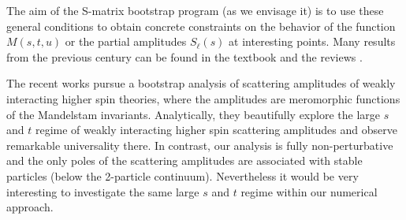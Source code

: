 \documentclass[12pt]{article}
\newcommand{\<}{{\langle}}
\renewcommand{\>}{{\rangle}}
\begin{document}
The aim of the S-matrix bootstrap program (as we envisage it) is to use these general conditions to obtain concrete constraints on the behavior of the function $M(s,t,u)$ or the partial amplitudes $S_\ell(s)$ at interesting points. Many results from the previous century can be found in the textbook \cite{martinbook} and the reviews \cite{tourdefrance,Martin:944356}.

The recent works \cite{Caron-Huot:2016icg,Sever:2017ylk}  pursue a bootstrap analysis of scattering amplitudes of weakly interacting higher spin theories, where the amplitudes are meromorphic functions of the Mandelstam invariants. Analytically, they beautifully explore the large $s$ and $t$ regime of weakly interacting higher spin scattering amplitudes and observe remarkable universality there. In contrast, our analysis is fully non-perturbative and the only poles of the scattering amplitudes are associated with stable particles (below the 2-particle continuum). Nevertheless it would be very interesting to investigate the same large $s$ and $t$ regime within our numerical approach. 
\end{document}
